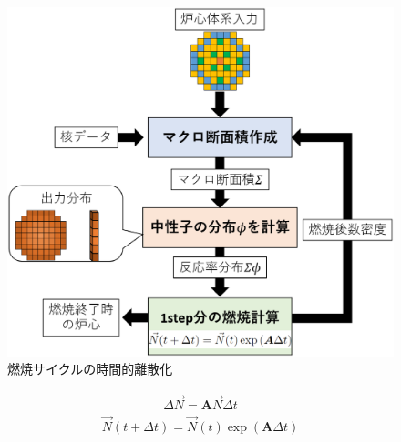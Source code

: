 \begin{figure}[htbp]
  \begin{center}
  \includegraphics[width=120mm]{figure/time-discretization.eps}
  \caption{燃焼サイクルの時間的離散化}\label{time-discretization}
  \end{center}
\end{figure}

\begin{align}
  \Delta\vec{N} = \bm{A} \vec{N} \Delta t   \label{BurnupEqDis}
\end{align}
\begin{align}
  \vec{N}(t + \Delta t) = \vec{N}(t) \exp{( \bm{A} \Delta t )} \label{BurnupEqDisSol}
\end{align}


\printbibliography[segment=\therefsegment,heading=subbibliography]

\newpage